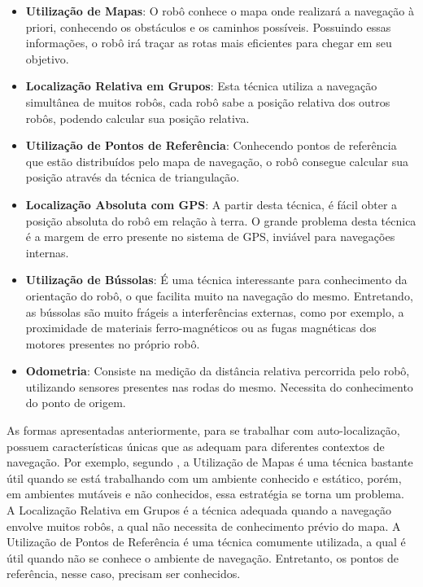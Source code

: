 	\begin{itemize}
		\item \textbf{Utilização de Mapas}: O robô conhece o mapa onde realizará a navegação à priori, conhecendo os obstáculos e os caminhos possíveis. Possuindo essas informações, o robô irá traçar as rotas mais eficientes para chegar em seu objetivo.

		\item \textbf{Localização Relativa em Grupos}: Esta técnica utiliza a navegação simultânea de muitos robôs, cada robô sabe a posição relativa dos outros robôs, podendo calcular sua posição relativa.

		\item \textbf{Utilização de Pontos de Referência}: Conhecendo pontos de referência que estão distribuídos pelo mapa de navegação, o robô consegue calcular sua posição através da técnica de triangulação.

		\item \textbf{Localização Absoluta com GPS}: A partir desta técnica, é fácil obter a posição absoluta do robô em relação à terra. O grande problema desta técnica é a margem de erro presente no sistema de GPS, inviável para navegações internas.

		\item \textbf{Utilização de Bússolas}: É uma técnica interessante para conhecimento da orientação do robô, o que facilita muito na navegação do mesmo. Entretando, as bússolas são muito frágeis a interferências externas, como por exemplo, a proximidade de materiais ferro-magnéticos ou as fugas magnéticas dos motores presentes no próprio robô.

		\item \textbf{Odometria}: Consiste na medição da distância relativa percorrida pelo robô, utilizando sensores presentes nas rodas do mesmo. Necessita do conhecimento do ponto de origem.
		 
	\end{itemize}

	As formas apresentadas anteriormente, para se trabalhar com auto-localização, possuem características únicas que as adequam para diferentes contextos de navegação. Por exemplo, segundo \cite{roboBulldozerIV}, a Utilização de Mapas é uma técnica bastante útil quando se está trabalhando com um ambiente conhecido e estático, porém, em ambientes mutáveis e não conhecidos, essa estratégia se torna um problema. A Localização Relativa em Grupos é a técnica adequada quando a navegação envolve muitos robôs, a qual não necessita de conhecimento prévio do mapa. A Utilização de Pontos de Referência é uma técnica comumente utilizada, a qual é útil quando não se conhece o ambiente de navegação. Entretanto, os pontos de referência, nesse caso, precisam ser conhecidos. 

